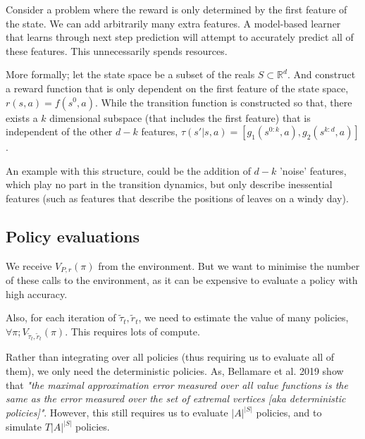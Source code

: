 
Consider a problem where the reward is only determined by the first feature of the state.
We can add arbitrarily many extra features. A model-based learner that learns through next step prediction will attempt to
accurately predict all of these features. This unnecessarily spends resources.

More formally; let the state space be a subset of the reals $S \subset \mathbb R^d$.
And construct a reward function that is only dependent on the first feature of the state space, $r(s, a) = f(s^0, a)$.
While the transition function is constructed so that, there exists a $k$ dimensional subspace (that includes the first feature)
that is independent of the other $d-k$ features, $\tau(s'|s, a) = [g_1(s^{0:k}, a), g_2(s^{k:d}, a)]$.

An example with this structure, could be the addition of $d-k$ 'noise' features,
which play no part in the transition dynamics, but only describe inessential features
(such as features that describe the positions of leaves on a windy day).

%

\subsection{Policy evaluations}

We receive $V_{P, r}(\pi)$ from the environment. But we want to minimise the number
of these calls to the environment, as it can be expensive to evaluate a policy with high accuracy.

Also, for each iteration of $\tilde \tau_t, \tilde r_t$, we need to estimate the
value of many policies, $\forall \pi; V_{\tilde \tau_t, \tilde r_t}(\pi)$. This requires lots of compute.

Rather than integrating over all policies (thus requiring us to evaluate all of them),
we only need the deterministic policies. As, Bellamare et al. 2019 show that \textit{"the maximal approximation error
measured over all value functions is the same as the error measured over the set of extremal vertices [aka deterministic policies]"}\cite{Bellemare2019b}.
However, this still requires us to evaluate $|A|^{|S|}$ policies, and to simulate $T |A|^{|S|}$ policies. \footnotemark

